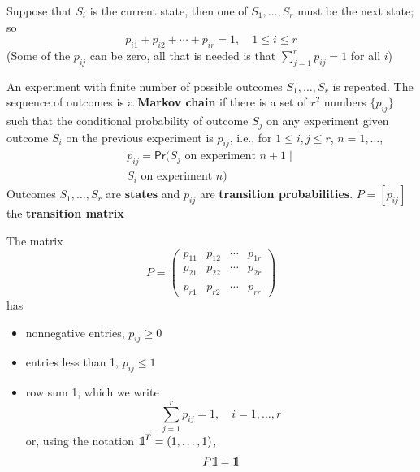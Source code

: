 \documentclass[aspectratio=169]{beamer}
\begin{document}
\begin{frame} 
Suppose that $S_i$ is the current state, then one of $S_1, \ldots,S_r$ must be the next state; so
\[
p_{i1}+p_{i2}+\cdots+p_{ir}=1, \quad 1\leq i\leq r
\]
(Some of the $p_{ij}$ can be zero, all that is needed is that $\sum_{j=1}^r p_{ij}=1$ for all $i$)
\vfill
\begin{definition}
An experiment with finite number of possible outcomes $S_1,\ldots,S_r$ is repeated. The sequence of outcomes is a \textbf{Markov chain} if there is a set of $r^2$ numbers $\{p_{ij}\}$ such that the conditional probability of outcome $S_j$ on any experiment given outcome $S_i$ on the previous experiment is $p_{ij}$, i.e., for $1\leq i,j\leq r$, $n=1,\ldots$,
\begin{multline*}
	p_{ij}=\mathsf{Pr}(S_j\textrm{ on experiment }n+1\;|\; \\
	S_i\textrm{ on experiment }n)	
\end{multline*}
Outcomes $S_1,\ldots,S_r$ are \textbf{states} and $p_{ij}$ are \textbf{transition probabilities}. $P=[p_{ij}]$ the \textbf{transition matrix}
\end{definition}
\end{frame}


\begin{frame} 
The matrix 
\[
P=
\begin{pmatrix}
p_{11} & p_{12} & \cdots & p_{1r} \\
p_{21} & p_{22} & \cdots & p_{2r} \\
&&& \\
p_{r1} & p_{r2} & \cdots & p_{rr}
\end{pmatrix}
\]
has
\begin{itemize}
\item nonnegative entries, $p_{ij}\geq 0$
\item entries less than 1, $p_{ij}\leq 1$
\item row sum 1, which we write
\[
\sum_{j=1}^r p_{ij}=1,\quad i=1,\ldots,r
\]
or, using the notation $\nbOne^T=(1,\ldots,1)$,
\[
P\nbOne=\nbOne
\]
\end{itemize}
\end{frame}


\end{document}

